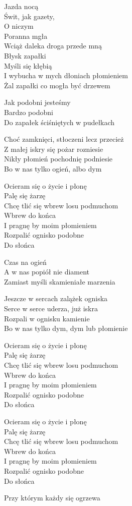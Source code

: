 \begin{text}
    Jazda nocą\\
    Świt, jak gazety,\\
    O niczym\\
    Poranna mgła\\
    Wciąż daleka droga przede mną\\
    Błysk zapałki\\
    Myśli się kłębią\\
    I wybucha w mych dłoniach płomieniem\\
    Żal zapałki co mogła być drzewem

    Jak podobni jesteśmy\\
    Bardzo podobni\\
    Do zapałek ściśniętych w pudełkach

    Choć zamknięci, stłoczeni lecz przecież\\
    Z małej iskry się pożar rozniesie\\
    Nikły płomień pochodnię podniesie\\
    Bo w nas tylko ogień, albo dym

    Ocieram się o życie i płonę\\
    Palę się żarzę\\
    Chcę tlić się wbrew losu podmuchom\\
    Wbrew do końca\\
    I pragnę by moim płomieniem\\
    Rozpalić ognisko podobne\\
    Do słońca

    Czas na ogień\\
    A w nas popiół nie diament\\
    Zamiast myśli skamieniałe marzenia

    Jeszcze w sercach zalążek ogniska\\
    Serce w serce uderza, już iskra\\
    Rozpali w ognisku kamienie\\
    Bo w nas tylko dym, dym lub płomienie

    Ocieram się o życie i płonę\\
    Palę się żarzę\\
    Chcę tlić się wbrew losu podmuchom\\
    Wbrew do końca\\
    I pragnę by moim płomieniem\\
    Rozpalić ognisko podobne\\
    Do słońca

    Ocieram się o życie i płonę\\
    Palę się żarzę\\
    Chcę tlić się wbrew losu podmuchom\\
    Wbrew do końca\\
    I pragnę by moim płomieniem\\
    Rozpalić ognisko podobne\\
    Do słońca

    Przy którym każdy się ogrzewa
\end{text}
\begin{chord}

\end{chord}